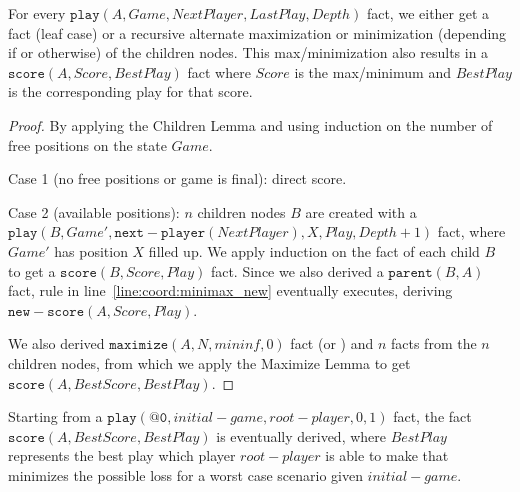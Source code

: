 \begin{theorem}

For every $\mathtt{play}(A, Game, NextPlayer, LastPlay, Depth)$ fact, we either
get a  fact (leaf case) or a recursive alternate maximization or
minimization (depending if  or otherwise) of the
children nodes. This max/minimization also results in a $\mathtt{score}(A,
Score, BestPlay)$ fact where $Score$ is the max/minimum and $BestPlay$ is the
corresponding play for that score.

\end{theorem}
\begin{proof}
By applying the Children Lemma and using induction on the number of free
positions on the state $Game$.

Case 1 (no free positions or game is final): direct score.

Case 2 (available positions): $n$ children nodes $B$ are created with a
$\mathtt{play}(B, Game', \mathtt{next-player}(NextPlayer), X, Play, Depth + 1)$
fact, where $Game'$ has position $X$ filled up. We apply induction on the
 fact of each child $B$ to get a $\mathtt{score}(B, Score, Play)$
fact. Since we also derived a $\mathtt{parent}(B, A)$ fact, rule in
line~\ref{line:coord:minimax_new} eventually executes, deriving
$\mathtt{new-score}(A, Score, Play)$.

We also derived $\mathtt{maximize}(A, N, mininf, 0)$ fact (or )
and $n$  facts from the $n$ children nodes, from which we apply
the Maximize Lemma to get $\mathtt{score}(A, BestScore, BestPlay)$.

\end{proof}

\begin{corollary}[MiniMax]

Starting from a $\mathtt{play}(\mathtt{@0}, initial-game, root-player, 0, 1)$
fact, the fact $\mathtt{score}(A, BestScore, BestPlay)$ is eventually derived,
where $BestPlay$ represents the best play which player $root-player$ is able to
make that minimizes the possible loss for a worst case scenario given
$initial-game$.

\end{corollary}
